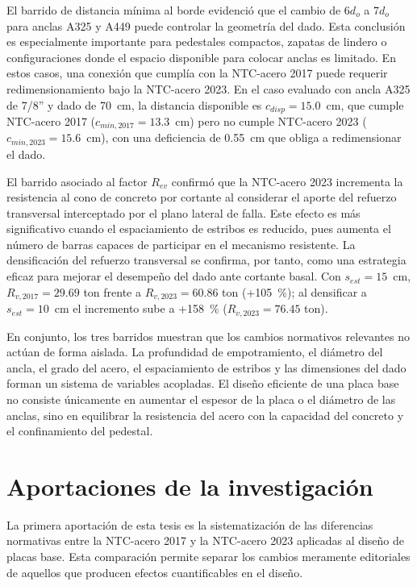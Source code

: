El barrido de distancia mínima al borde evidenció que el cambio de $6d_o$ a $7d_o$ para anclas A325
y A449 puede controlar la geometría del dado. Esta conclusión es especialmente importante para
pedestales compactos, zapatas de lindero o configuraciones donde el espacio disponible para colocar
anclas es limitado. En estos casos, una conexión que cumplía con la NTC-acero 2017 puede requerir
redimensionamiento bajo la NTC-acero 2023. En el caso evaluado con ancla A325 de 7/8'' y dado de
70~cm, la distancia disponible es $c_{disp}=15.0$~cm, que cumple NTC-acero 2017
($c_{min,2017}=13.3$~cm) pero no cumple NTC-acero 2023 ($c_{min,2023}=15.6$~cm), con una
deficiencia de 0.55~cm que obliga a redimensionar el dado.

El barrido asociado al factor $R_{ev}$ confirmó que la NTC-acero 2023 incrementa la resistencia al
cono de concreto por cortante al considerar el aporte del refuerzo transversal interceptado por el
plano lateral de falla. Este efecto es más significativo cuando el espaciamiento de estribos es
reducido, pues aumenta el número de barras capaces de participar en el mecanismo resistente. La
densificación del refuerzo transversal se confirma, por tanto, como una estrategia eficaz para
mejorar el desempeño del dado ante cortante basal. Con $s_{est}=15$~cm, $R_{v,2017}=29.69$ ton
frente a $R_{v,2023}=60.86$ ton (+105~\%); al densificar a $s_{est}=10$~cm el incremento sube a
+158~\% ($R_{v,2023}=76.45$ ton).

En conjunto, los tres barridos muestran que los cambios normativos relevantes no actúan de forma
aislada. La profundidad de empotramiento, el diámetro del ancla, el grado del acero, el espaciamiento
de estribos y las dimensiones del dado forman un sistema de variables acopladas. El diseño eficiente
de una placa base no consiste únicamente en aumentar el espesor de la placa o el diámetro de las
anclas, sino en equilibrar la resistencia del acero con la capacidad del concreto y el confinamiento
del pedestal.

\section{Aportaciones de la investigación}

La primera aportación de esta tesis es la sistematización de las diferencias normativas entre la
NTC-acero 2017 y la NTC-acero 2023 aplicadas al diseño de placas base. Esta comparación permite
separar los cambios meramente editoriales de aquellos que producen efectos cuantificables en el
diseño.


